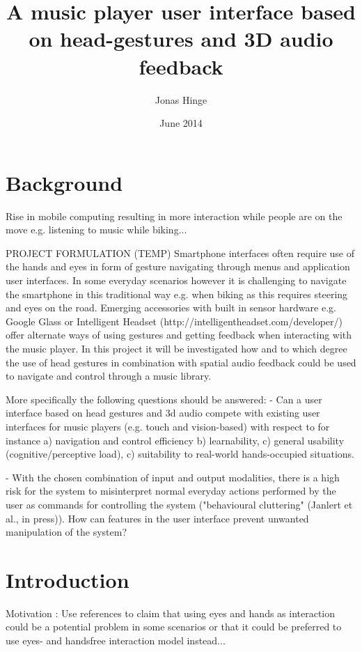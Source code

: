 \documentclass{article}
\title{A music player user interface based on head-gestures and 3D audio feedback}
\author{Jonas Hinge}
\date{June 2014}
\begin{document}
\maketitle

\section{Background}
Rise in mobile computing resulting in more interaction while people are on the move e.g. listening to music while biking...

PROJECT FORMULATION (TEMP)
Smartphone interfaces often require use of the hands and eyes in form of gesture navigating through menus and application user interfaces. In some everyday scenarios however it is challenging to navigate the smartphone in this traditional way e.g. when biking as this requires steering and eyes on the road. Emerging accessories with built in sensor hardware e.g. Google Glass or Intelligent Headset (http://intelligentheadset.com/developer/) offer alternate ways of using gestures and getting feedback when interacting with the music player. In this project it will be investigated how and to which degree the use of head gestures in combination with spatial audio feedback could be used to navigate and control through a music library. 

More specifically the following questions should be answered: 
- Can a user interface based on head gestures and 3d audio compete with existing user interfaces for music players (e.g. touch and vision-based) with respect to for instance a) navigation and control efficiency b) learnability, c) general usability (cognitive/perceptive load), c) suitability to real-world hands-occupied situations. 

- With the chosen combination of input and output modalities, there is a high risk for the system to misinterpret normal everyday actions performed by the user as commands for controlling the system ("behavioural cluttering" (Janlert et al., in press)). How can features in the user interface prevent unwanted manipulation of the system?

\clearpage

\tableofcontents

\clearpage

\section{Introduction}
Motivation : Use references to claim that using eyes and hands as interaction could be a potential problem in some scenarios or that it could be preferred to use eyes- and handsfree interaction model instead...
\end{document}
